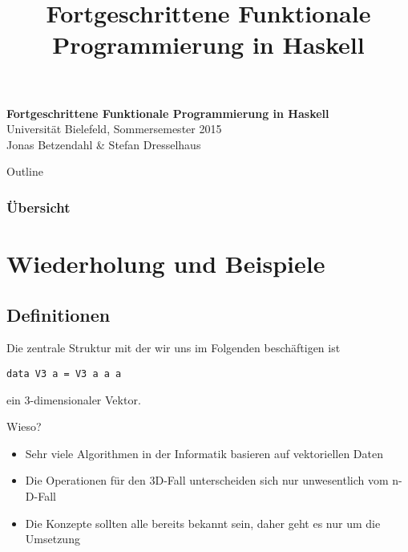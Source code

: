 \documentclass{beamer}
\title{Fortgeschrittene Funktionale Programmierung in Haskell}
\begin{document}
  

  \begin{frame}
  \begin{center}
    \huge\textbf{Fortgeschrittene Funktionale Programmierung in Haskell}\\ \bigskip
    \LARGE Universität Bielefeld, Sommersemester 2015\\ \bigskip
    \large Jonas Betzendahl \& Stefan Dresselhaus
    \end{center}
  \end{frame}

\begin{frame}[allowframebreaks]{Outline}
\frametitle{Übersicht}
\tableofcontents[hideallsubsections]
\end{frame}

\section{Wiederholung und Beispiele}

\subsection{Definitionen}

\begin{frame}[fragile]
Die zentrale Struktur mit der wir uns im Folgenden beschäftigen ist
\pause
\begin{verbatim}
data V3 a = V3 a a a
\end{verbatim}
ein 3-dimensionaler Vektor.\\ \par
\pause
Wieso?
\pause
\begin{itemize}
 \item Sehr viele Algorithmen in der Informatik basieren auf vektoriellen Daten
 \pause
 \item Die Operationen für den 3D-Fall unterscheiden sich nur unwesentlich vom n-D-Fall
 \pause
 \item Die Konzepte sollten alle bereits bekannt sein, daher geht es nur um die Umsetzung
\end{itemize}
\end{frame}
\end{document}
